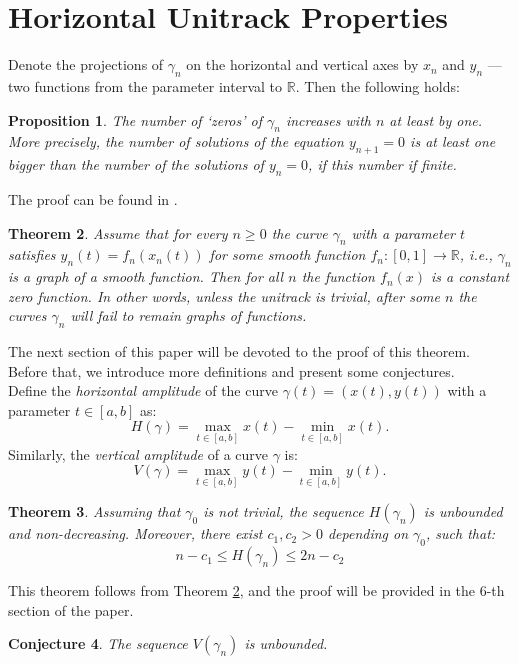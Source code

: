 \documentclass{article}
\newtheorem{theorem}{Theorem}[section]
\newtheorem{conjecture}[theorem]{Conjecture}
\newtheorem{prop}[theorem]{Proposition}
\theoremstyle{definition}
\newcommand{\R}{{\mathbb R}}
\newcommand{\Le}{\leqslant}
\newcommand{\Ge}{\geqslant}
\newcommand{\lims}{\limits}
\begin{document}
\section{Horizontal Unitrack Properties}\label{sec4}
    Denote the projections of $\gamma_n$ on the horizontal and vertical axes by $x_n$ and $y_n$ --- two functions from the parameter interval to $\R$. Then the following  holds:
    \begin{prop}
    \label{zeros}
        The number of `zeros' of $\gamma_n$ increases with $n$ at least by one. More precisely, the number of solutions of the equation $y_{n+1}=0$ is at least one bigger than the number of the solutions of $y_n=0$, if this number if finite. 
    \end{prop}
    The proof can be found in \cite{LT}.
    \begin{theorem}
    \label{graphs}
        Assume that for every $n\Ge 0$ the curve $\gamma_n$ with a parameter $t$ satisfies $y_n(t) = f_n(x_n(t))$ for some smooth function $f_n\colon[0, 1]\to\R$, i.e., $\gamma_n$ is a graph of a smooth function. Then for all $n$ the function $f_n(x)$ is a constant zero function. In other words, unless the unitrack is trivial, after some $n$ the curves $\gamma_n$ will fail to remain graphs of functions.
    \end{theorem}
    The next section of this paper will be devoted to the proof of this theorem. Before that, we introduce more definitions and present some conjectures.\\
    
    Define the \textit{horizontal amplitude} of the curve $\gamma(t) = (x(t), y(t))$ with a parameter $t\in[a, b]$ as:
    $$
    H(\gamma) = \max\lims_{t\in[a, b]}{x(t)} - \min\lims_{t\in[a, b]}{x(t)}.
    $$
    Similarly, the \textit{vertical amplitude} of a curve $\gamma$ is:
    $$
    V(\gamma) = \max\lims_{t\in[a, b]}{y(t)} - \min\lims_{t\in[a, b]}{y(t)}.
    $$
    \begin{theorem}
    \label{hor-ampl}
        Assuming that $\gamma_0$ is not trivial, the sequence $H(\gamma_n)$ is unbounded and non-decreasing. Moreover, there exist $c_1, c_2 > 0$ depending on $\gamma_0$, such that:
        $$
        n - c_1 \Le H(\gamma_n) \Le 2n - c_2
        $$
    \end{theorem}
    This theorem follows from Theorem \ref{graphs}, and the proof will be provided in the 6-th section of the paper.
    \begin{conjecture}
    \label{vert-ampl}
        The sequence $V(\gamma_n)$ is unbounded.
    \end{conjecture}
\end{document}
